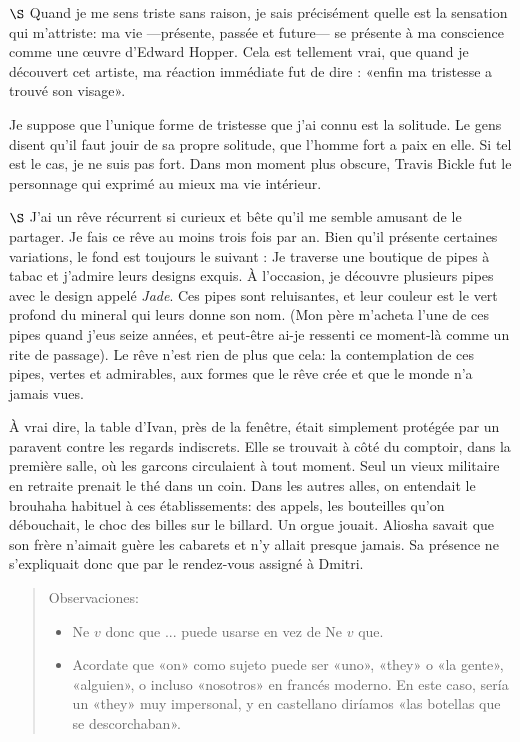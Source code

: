 \documentclass[a4paper, 12pt]{article}
\begin{document}
\pagebreak 

$\S$ Quand je me sens triste sans raison, je sais précisément quelle est la
sensation qui m'attriste: ma vie ---présente, passée et future--- se présente à
ma conscience comme une œuvre d'Edward Hopper. Cela est tellement vrai, que
quand je découvert cet artiste, ma réaction immédiate fut de dire : «enfin ma
tristesse a trouvé son visage».

Je suppose que l'unique forme de tristesse que j'ai connu est la solitude. Le
gens disent qu'il faut jouir de sa propre solitude, que l'homme fort a paix en
elle. Si tel est le cas, je ne suis pas fort. Dans mon moment plus obscure,
Travis Bickle fut le personnage qui exprimé au mieux ma vie intérieur.

\pagebreak 

$\S$ J'ai un rêve récurrent si curieux et bête qu'il me semble amusant de le
partager. Je fais ce rêve au moins trois fois par an. Bien qu'il présente
certaines variations, le fond est toujours le suivant : Je traverse une boutique
de pipes à tabac et j'admire leurs designs exquis. À l'occasion, je découvre
plusieurs pipes avec le design appelé \textit{Jade}. Ces pipes sont reluisantes,
et leur couleur est le vert profond du mineral qui leurs donne son nom. (Mon
père m'acheta l'une de ces pipes quand j'eus seize années, et peut-être ai-je
ressenti ce moment-là comme un rite de passage). Le rêve n'est rien de plus que
cela: la contemplation de ces pipes, vertes et admirables, aux formes que le
rêve crée et que le monde n'a jamais vues. 







\pagebreak 

À vrai dire, la table d'Ivan, près de la fenêtre, était simplement protégée par
un paravent contre les regards indiscrets. Elle se trouvait à côté du comptoir,
dans la première salle, où les garcons circulaient à tout moment. Seul un vieux
militaire en retraite prenait le thé dans un coin. 
Dans les autres alles, on
entendait le brouhaha habituel à ces établissements: des appels, les bouteilles
qu'on débouchait, le choc des billes sur le billard.
Un orgue jouait. Aliosha
savait que son frère n'aimait guère les cabarets et n'y allait presque jamais.
Sa présence ne s'expliquait donc que par le rendez-vous assigné à Dmitri.

\begin{quote}
    Observaciones: 

    \begin{itemize}
        \item  Ne $v$ donc que ... puede usarse en vez de Ne $v$ que.
        \item Acordate que «on» como sujeto puede ser «uno», «they» o «la
            gente», «alguien», o incluso «nosotros» en francés moderno. En este
            caso, sería un «they» muy impersonal, y en castellano diríamos «las
            botellas que se descorchaban».
    \end{itemize}

\end{quote}
\end{document}
